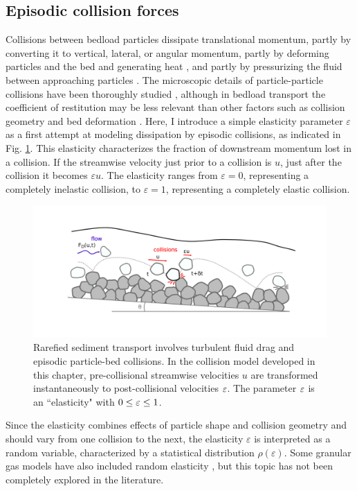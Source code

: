 \subsection{Episodic collision forces}
Collisions between bedload particles dissipate translational momentum, partly by converting it to vertical, lateral, or angular momentum, partly by deforming particles and the bed and generating heat \citep{Schmeeckle2014,Williams2021}, and partly by pressurizing the fluid between approaching particles \citep{Joseph2001,Schmeeckle2001}. 
The microscopic details of particle-particle collisions have been thoroughly studied \citep{Brach1989, Lorenz1997,Montaine2011}, although in bedload transport the coefficient of restitution may be less relevant than other factors such as collision geometry and bed deformation \citep{Pahtz2021}. Here, I introduce a simple elasticity parameter $\varepsilon$ as a first attempt at modeling dissipation by episodic collisions, as indicated in Fig. \ref{fig:fig1}. This elasticity characterizes the fraction of downstream momentum lost in a collision. If the streamwise velocity just prior to a collision is $u$, just after the collision it becomes $\varepsilon u$. The elasticity ranges from $\varepsilon=0$, representing a completely inelastic collision, to $\varepsilon=1$, representing a completely elastic collision.
\begin{figure}
	\centerline{\includegraphics{./figures/ch5/Fig1Concept.png}}
	\caption{Rarefied sediment transport involves turbulent fluid drag and episodic particle-bed collisions. In the collision model developed in this chapter, pre-collisional streamwise velocities $u$ are transformed instantaneously to post-collisional velocities $\varepsilon$. The parameter $\varepsilon$ is an ``elasticity" with $0\leq \varepsilon \leq 1$.}
	\label{fig:fig1}
\end{figure}

Since the elasticity combines effects of particle shape and collision geometry and should vary from one collision to the next, the elasticity $\varepsilon$ is interpreted as a random variable, characterized by a statistical distribution $\rho(\varepsilon)$.
Some granular gas models have also included random elasticity \citep[e.g.][]{Serero2015}, but this topic has not been completely explored in the literature.

